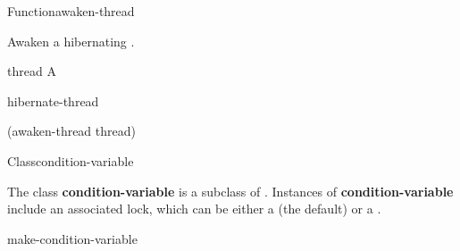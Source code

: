 \begin{functiondoc}{Function}{awaken-thread}{}
%
%

\fnsyntax

\fnpurpose Awaken a hibernating .

\fnpackage {}

\fnmodule {}

\fnargs
\begin{args}{thread}
\arg[thread] A 
\end{args}

\fnerrors
\nothreads{}

\begin{alsos}{hibernate-thread}
\end{alsos}

\fnexample
%
\W\supp
\begin{example}
  (awaken-thread thread)
\end{example}

\end{functiondoc}


\begin{functiondoc}{Class}{condition-variable}{}
%
  
\fnsyntax

\fnpackage {}

\fnmodule {}

\fndescription The class \textbf{condition-variable} is a subclass of
.  Instances of \textbf{condition-variable} include an
associated lock, which can be either a  (the default) or a
.

\begin{alsos}{make-condition-variable}
\end{alsos}

\end{functiondoc}


